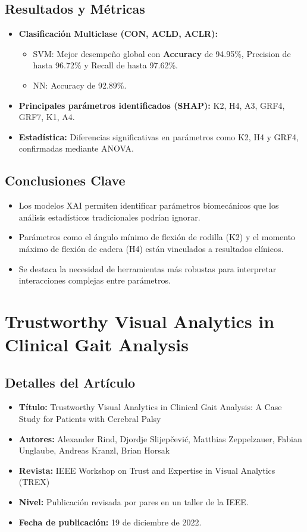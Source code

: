 \documentclass{report}
\begin{document}
\subsection{Resultados y Métricas}
\begin{itemize}
    \item \textbf{Clasificación Multiclase (CON, ACLD, ACLR):}
    \begin{itemize}
        \item SVM: Mejor desempeño global con \textbf{Accuracy} de 94.95\%, Precision de hasta 96.72\% y Recall de hasta 97.62\%.
        \item NN: Accuracy de 92.89\%.
    \end{itemize}
    \item \textbf{Principales parámetros identificados (SHAP):} K2, H4, A3, GRF4, GRF7, K1, A4.
    \item \textbf{Estadística:} Diferencias significativas en parámetros como K2, H4 y GRF4, confirmadas mediante ANOVA.
\end{itemize}

\subsection{Conclusiones Clave}
\begin{itemize}
    \item Los modelos XAI permiten identificar parámetros biomecánicos que los análisis estadísticos tradicionales podrían ignorar.
    \item Parámetros como el ángulo mínimo de flexión de rodilla (K2) y el momento máximo de flexión de cadera (H4) están vinculados a resultados clínicos.
    \item Se destaca la necesidad de herramientas más robustas para interpretar interacciones complejas entre parámetros.
\end{itemize}


\section{Trustworthy Visual Analytics in Clinical Gait Analysis}

\subsection{Detalles del Artículo}
\begin{itemize}
    \item \textbf{Título:} Trustworthy Visual Analytics in Clinical Gait Analysis: A Case Study for Patients with Cerebral Palsy
    \item \textbf{Autores:} Alexander Rind, Djordje Slijepčević, Matthias Zeppelzauer, Fabian Unglaube, Andreas Kranzl, Brian Horsak
    \item \textbf{Revista:} IEEE Workshop on Trust and Expertise in Visual Analytics (TREX)
    \item \textbf{Nivel:} Publicación revisada por pares en un taller de la IEEE.
    \item \textbf{Fecha de publicación:} 19 de diciembre de 2022.
\end{itemize}
\end{document}
